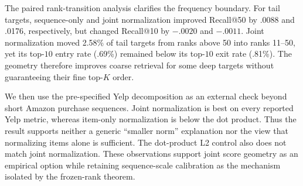 \documentclass[sigconf,anonymous,review]{acmart}
\begin{document}
The paired rank-transition analysis clarifies the frequency boundary. For tail targets, sequence-only and joint normalization improved Recall@50 by .0088 and .0176, respectively, but changed Recall@10 by $-.0020$ and $-.0011$. Joint normalization moved 2.58\% of tail targets from ranks above 50 into ranks 11--50, yet its top-$10$ entry rate (.69\%) remained below its top-$10$ exit rate (.81\%). The geometry therefore improves coarse retrieval for some deep targets without guaranteeing their fine top-$K$ order.

We then use the pre-specified Yelp decomposition as an external check beyond short Amazon purchase sequences. Joint normalization is best on every reported Yelp metric, whereas item-only normalization is below the dot product. Thus the result supports neither a generic ``smaller norm'' explanation nor the view that normalizing items alone is sufficient. The dot-product L2 control also does not match joint normalization. These observations support joint score geometry as an empirical option while retaining sequence-scale calibration as the mechanism isolated by the frozen-rank theorem.
\begin{table}[t]
\caption{External Yelp score-geometry decomposition ($d=256$), mean $\pm$
standard deviation over three matched seeds. $^\dagger$The L2 control uses one
seed only. These are external mechanism checks, not selected main-table scores.}
\label{tab:decomposition}\centering\scriptsize
{}\end{table}
\end{document}
